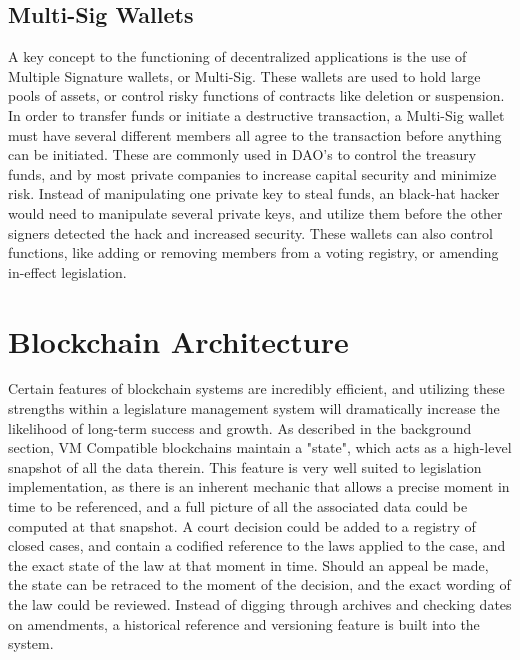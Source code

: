 \documentclass[letterpaper,twocolumn]{article}
\begin{document}
\subsection*{Multi-Sig Wallets}
A key concept to the functioning of decentralized applications is the use of Multiple Signature wallets, or Multi-Sig.  These wallets are used to hold large pools of assets, or control risky functions of contracts like deletion or suspension.  In order to transfer funds or initiate a destructive transaction, a Multi-Sig wallet must have several different members all agree to the transaction before anything can be initiated.  These are commonly used in DAO's to control the treasury funds, and by most private companies to increase capital security and minimize risk.  Instead of manipulating one private key to steal funds, an black-hat hacker would need to manipulate several private keys, and utilize them before the other signers detected the hack and increased security.  These wallets can also control functions, like adding or removing members from a voting registry, or amending in-effect legislation.


\section*{Blockchain Architecture}
Certain features of blockchain systems are incredibly efficient, and utilizing these strengths within a legislature management system will dramatically increase the likelihood of long-term success and growth.  As described in the background section, VM Compatible blockchains maintain a "state", which acts as a high-level snapshot of all the data therein.  This feature is very well suited to legislation implementation, as there is an inherent mechanic that allows a precise moment in time to be referenced, and a full picture of all the associated data could be computed at that snapshot.  A court decision could be added to a registry of closed cases, and contain a codified reference to the laws applied to the case, and the exact state of the law at that moment in time.  Should an appeal be made, the state can be retraced to the moment of the decision, and the exact wording of the law could be reviewed.  Instead of digging through archives and checking dates on amendments, a historical reference and versioning feature is built into the system.
\end{document}
